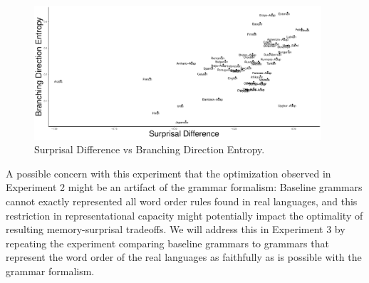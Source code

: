 \begin{figure}
\includegraphics[width=0.95\textwidth]{figures/surprisal-branching-entropy-REAL.pdf}
	\caption{Surprisal Difference vs Branching Direction Entropy. }\label{fig:hist-real}
\end{figure}





A possible concern with this experiment that the optimization observed in Experiment 2 might be an artifact of the grammar formalism:
Baseline grammars cannot exactly represented all word order rules found in real languages, and this restriction in representational capacity might potentially impact the optimality of resulting memory-surprisal tradeoffs.
We will address this in Experiment 3 by repeating the experiment comparing baseline grammars to grammars that represent the word order of the real languages as faithfully as is possible with the grammar formalism.


